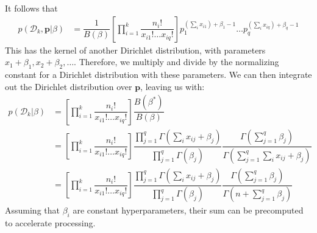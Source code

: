 \documentclass{article}
\begin{document}
It follows that
\begin{align*}
  p(\mathcal{D}_k ,\mathbf{p}|\beta) &= \dfrac{1}{B(\beta)}\left[\prod_{i=1}^k\dfrac{n_i!}{x_{i1}! \dots x_{iq}!}\right]p_1^{(\sum_i x_{i1})+\beta_1-1}\dots p_q^{(\sum_i x_{iq})+\beta_q-1}
\end{align*}
This has the kernel of another Dirichlet distribution, with parameters
$x_1+\beta_1, x_2 + \beta_2, \dots$.  Therefore, we multiply and divide
by the normalizing constant for a Dirichlet distribution with these
parameters.  We can then integrate out the Dirichlet distribution over
$\mathbf{p}$, leaving us with:
\begin{align}
  p(\mathcal{D}_k | \beta) &= \left[\prod_{i=1}^k\dfrac{n_i!}{x_{i1}! \dots x_{iq}!}\right]\dfrac{B(\beta^*)}{B(\beta)} \nonumber \\
    &= \left[\prod_{i=1}^k\dfrac{n_i!}{x_{i1}! \dots x_{iq}!}\right] \dfrac{\prod_{j=1}^q\Gamma(\sum_i x_{ij} +\beta_j)}{\prod_{j=1}^q\Gamma(\beta_j)} \dfrac{\Gamma(\sum_{j=1}^q\beta_j)}{\Gamma(\sum_{j=1}^q \sum_i x_{ij}+\beta_j)} \nonumber \\
    &= \left[\prod_{i=1}^k\dfrac{n_i!}{x_{i1}! \dots x_{iq}!}\right] \dfrac{\prod_{j=1}^q\Gamma(\sum_i x_{ij} +\beta_j)}{\prod_{j=1}^q\Gamma(\beta_j)} \dfrac{\Gamma(\sum_{j=1}^q\beta_j)}{\Gamma(n + \sum_{j=1}^q \beta_j)}
\end{align}
Assuming that $\beta_i$ are constant hyperparameters, their sum can be precomputed to accelerate processing.
\end{document}
